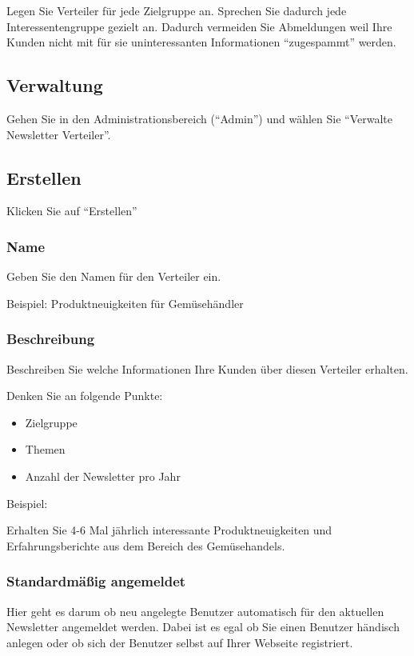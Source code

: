 \documentclass[article, a4paper, oneside, 11pt]{memoir}
\begin{document}
Legen Sie Verteiler für jede Zielgruppe an. Sprechen Sie dadurch jede Interessentengruppe gezielt an. Dadurch vermeiden Sie Abmeldungen weil Ihre Kunden nicht mit für sie uninteressanten Informationen "`zugespammt"' werden.

\subsection{Verwaltung}

Gehen Sie in den Administrationsbereich ("`Admin"') und wählen Sie "`Verwalte Newsletter Verteiler"'.

\subsection{Erstellen}
\label{sec:create-mailing-list}

Klicken Sie auf "`Erstellen"'

\subsubsection{Name}

Geben Sie den Namen für den Verteiler ein.

Beispiel: Produktneuigkeiten für Gemüsehändler

\subsubsection{Beschreibung}

Beschreiben Sie welche Informationen Ihre Kunden über diesen Verteiler erhalten.

Denken Sie an folgende Punkte:
\begin{itemize}
 \item Zielgruppe
 \item Themen
 \item Anzahl der Newsletter pro Jahr
\end{itemize}

Beispiel:  

Erhalten Sie 4-6 Mal jährlich interessante Produktneuigkeiten und Erfahrungsberichte aus dem Bereich des Gemüsehandels.

\subsubsection{Standardmäßig angemeldet}

Hier geht es darum ob neu angelegte Benutzer automatisch für den aktuellen Newsletter angemeldet werden.
Dabei ist es egal ob Sie einen Benutzer händisch anlegen oder ob sich der Benutzer selbst auf Ihrer Webseite registriert.
\end{document}
